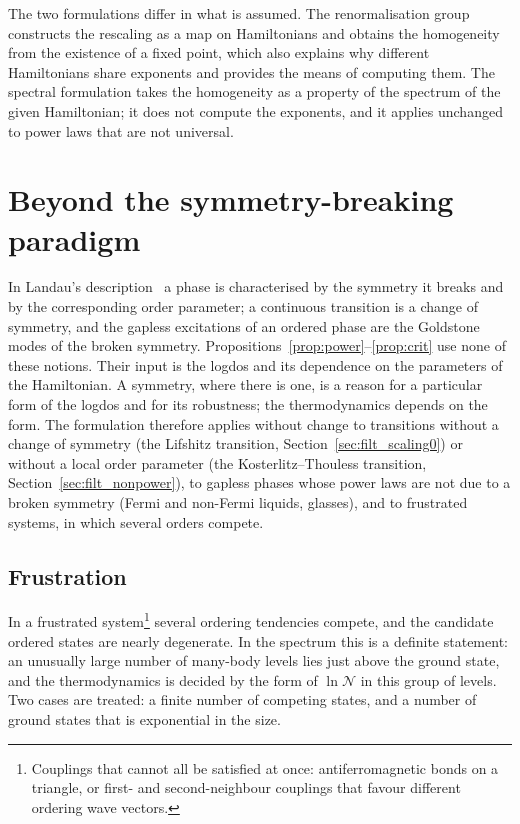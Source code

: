 \documentclass[10pt,a4paper]{article}
\theoremstyle{plain}
\newcommand{\cN}{\mathcal{N}}   %
\newcommand{\lndos}{{logdos}}  %
\begin{document}
The two formulations differ in what is assumed. The renormalisation group
constructs the rescaling as a map on Hamiltonians and obtains the
homogeneity from the existence of a fixed point, which also explains why
different Hamiltonians share exponents and provides the means of computing
them. The spectral formulation takes the homogeneity as a property of the
spectrum of the given Hamiltonian; it does not compute the exponents, and it
applies unchanged to power laws that are not universal.

\section{Beyond the symmetry-breaking paradigm}
\label{sec:beyond}

In Landau's description~\cite{LandauLifshitz5} a phase is characterised by
the symmetry it breaks and by the corresponding order parameter; a
continuous transition is a change of symmetry, and the gapless excitations
of an ordered phase are the Goldstone modes of the broken symmetry.
Propositions~\ref{prop:power}--\ref{prop:crit} use none of these notions.
Their input is the \lndos{} and its dependence on the parameters of the
Hamiltonian. A symmetry, where there is one, is a reason for a
particular form of the \lndos{} and for its robustness; the thermodynamics
depends on the form. The formulation therefore applies without change to
transitions without a change of symmetry (the Lifshitz transition,
Section~\ref{sec:filt_scaling0}) or without a local order parameter (the
Kosterlitz--Thouless transition, Section~\ref{sec:filt_nonpower}), to
gapless phases whose power laws are not due to a broken symmetry (Fermi and
non-Fermi liquids, glasses), and to frustrated systems, in which several
orders compete.

\subsection{Frustration}
\label{sec:frustration}

In a frustrated system\footnote{Couplings that cannot all be satisfied at
once: antiferromagnetic bonds on a triangle, or first- and second-neighbour
couplings that favour different ordering wave vectors.} several ordering
tendencies compete, and the candidate ordered states are nearly degenerate.
In the spectrum this is a definite statement: an unusually large number of
many-body levels lies just above the ground state, and the thermodynamics
is decided by the form of $\ln\cN$ in this group of levels. Two cases are
treated: a finite number of competing states, and a number of ground states
that is exponential in the size.
\end{document}
